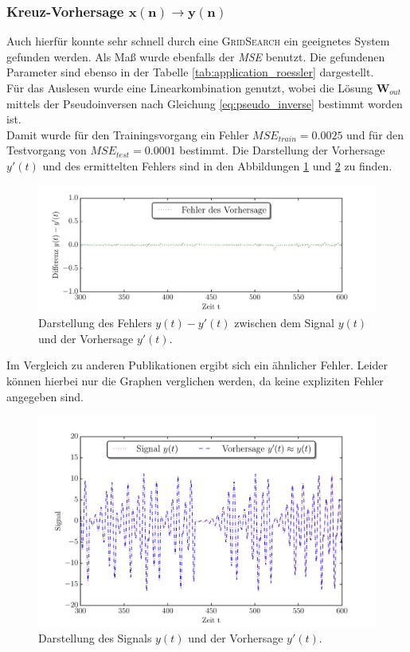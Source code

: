 \subsubsection[Kreuz-Vorhersage $x(n) \rightarrow y(n)$]{Kreuz-Vorhersage $\pmb{x(n) \rightarrow y(n)}$}
Auch hierfür konnte sehr schnell durch eine \textsc{GridSearch} ein geeignetes System gefunden werden. Als Maß wurde ebenfalls der \textit{MSE} benutzt. Die gefundenen Parameter sind ebenso in der Tabelle \ref{tab:application_roessler} dargestellt.\\
Für das Auslesen wurde eine Linearkombination genutzt, wobei die Lösung $\mathbf{W}_{out}$ mittels der Pseudoinversen nach Gleichung \ref{eq:pseudo_inverse} bestimmt worden ist.\\

Damit wurde für den Trainingsvorgang ein Fehler $MSE_{train} = 0.0025$ und für den Testvorgang von $MSE_{test} = 0.0001$ bestimmt. Die Darstellung der Vorhersage $y'(t)$ und des ermittelten Fehlers sind in den Abbildungen \ref{fig:application_roessler_b1} und \ref{fig:application_roessler_b2} zu finden.

\begin{figure}[H]
    \centering
     \includegraphics[width = 0.9 \textwidth]{figures/roessler_cross_err.pdf}
    \caption{Darstellung des Fehlers $y(t)-y'(t)$ zwischen dem Signal $y(t)$ und der Vorhersage $y'(t)$.}
    \label{fig:application_roessler_b1}
\end{figure}
 Im Vergleich zu anderen Publikationen \cite{parlitz2005} ergibt sich ein ähnlicher Fehler. Leider können hierbei nur die Graphen verglichen werden, da keine expliziten Fehler angegeben sind.


\begin{figure}[H]
    \centering
     \includegraphics[width = 0.9 \textwidth]{figures/roessler_cross_pred.pdf}
      \caption{Darstellung des Signals $y(t)$ und der Vorhersage $y'(t)$.}
    \label{fig:application_roessler_b2}
\end{figure}


